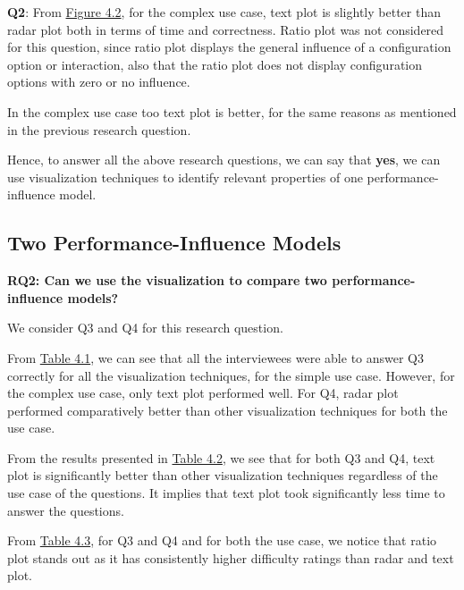 \textbf{Q2}: From \hyperref[figure:paretoOneQ2]{Figure 4.2}, for the complex use case, text plot is slightly better than radar plot both in terms of time and correctness. Ratio plot was not considered for this question, since ratio plot displays the general influence of a configuration option or interaction, also that the ratio plot does not display configuration options with zero or no influence.

In the complex use case too text plot is better, for the same reasons as mentioned in the previous research question.

Hence, to answer all the above research questions, we can say that \textbf{yes}, we can use visualization techniques to identify relevant properties of one performance-influence model.

\subsection*{Two Performance-Influence Models}
\vskip 0.2in
\begin{mdframed}
\textbf{RQ2: Can we use the visualization to compare two performance-influence models?}
\end{mdframed}

We consider Q3 and Q4 for this research question.

\begin{description}[leftmargin=0pt]
\item[Correctness: ]From \hyperref[table:correctness]{Table 4.1}, we can see that all the interviewees were able to answer Q3 correctly for all the visualization techniques, for the simple use case. However, for the complex use case, only text plot performed well. For Q4, radar plot performed comparatively better than other visualization techniques for both the use case.

\item[Time Measurements: ]From the results presented in \hyperref[table:time]{Table 4.2}, we see that for both Q3 and Q4, text plot is significantly better than other visualization techniques regardless of the use case of the questions. It implies that text plot took significantly less time to answer the questions.

\item[Difficulty Ratings: ] From \hyperref[table:rating]{Table 4.3}, for Q3 and Q4 and for both the use case, we notice that ratio plot stands out as it has consistently higher difficulty ratings than radar and text plot. 
\end{description}

